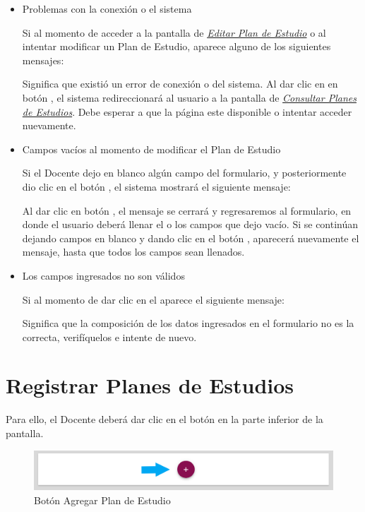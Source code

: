 \begin{itemize}
	\item Problemas con la conexión o el sistema

	Si al momento de acceder a la pantalla de \hyperlink{editarPE}{\textit{Editar Plan de Estudio}} o al intentar modificar un Plan de Estudio, aparece alguno de los siguientes mensajes:


	Significa que existió un error de conexión o del sistema. Al dar clic en en botón  , el sistema redireccionará al usuario a la pantalla de \hyperlink{consultarPE}{\textit{Consultar Planes de Estudios}}. Debe esperar a que la página este disponible o intentar acceder nuevamente.

	\item Campos vacíos al momento de modificar el Plan de Estudio

	Si el Docente dejo en blanco algún campo del formulario, y posteriormente dio clic en el botón  , el sistema mostrará el siguiente mensaje:


	Al dar clic en botón  , el mensaje se cerrará y regresaremos al formulario, en donde el usuario deberá llenar el o los campos que dejo vacío. Si se continúan dejando campos en blanco y dando clic en el botón  , aparecerá nuevamente el mensaje, hasta que todos los campos sean llenados.

	\item Los campos ingresados no son válidos

	Si al momento de dar clic en el  aparece el siguiente mensaje:

	Significa que la composición de los datos ingresados en el formulario no es la correcta, verifíquelos e intente de nuevo.

\end{itemize}
\newpage
\section{Registrar Planes de Estudios}

Para ello, el Docente deberá dar clic en el botón \IUbutton{+} en la parte inferior de la pantalla.

\begin{figure}[!hbtp]
    \centering
    \hypertarget{add}{\includegraphics[width=0.7\linewidth]{images/SP4-GPE/mas}}
    \caption{Botón Agregar Plan de Estudio}
    \label{add}
\end{figure}

